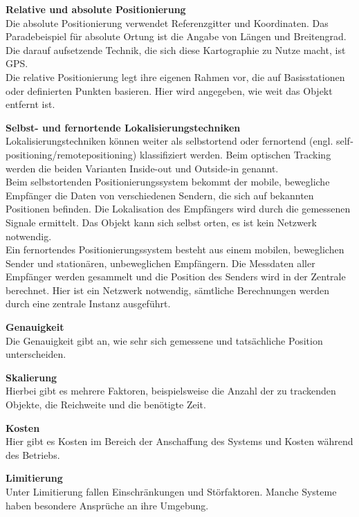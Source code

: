     \textbf{Relative und absolute Positionierung}\\
    Die absolute Positionierung verwendet Referenzgitter und Koordinaten. Das Paradebeispiel für absolute Ortung ist die Angabe von Längen­ und Breitengrad.   Die darauf aufsetzende Technik, die sich diese Kartographie zu Nutze macht, ist GPS. \\
    Die relative Positionierung legt ihre eigenen Rahmen vor, die auf Basisstationen oder definierten Punkten basieren. Hier wird angegeben, wie weit das Objekt entfernt ist.

    \textbf{Selbst- und fernortende Lokalisierungstechniken}\\
    Lokalisierungstechniken können weiter als selbstortend oder fernortend (engl. self­positioning/remote­positioning) klassifiziert werden. Beim optischen Tracking werden die beiden Varianten Inside-out und Outside-in genannt.\\
    Beim selbstortenden Positionierungssystem bekommt der mobile, bewegliche Empfänger die Daten von verschiedenen Sendern, die sich auf bekannten Positionen befinden. Die Lokalisation des Empfängers wird durch die gemessenen Signale ermittelt. Das Objekt kann sich selbst orten, es ist kein Netzwerk notwendig.\\
    Ein fernortendes Positionierungssystem besteht aus einem mobilen, beweglichen Sender und stationären, unbeweglichen Empfängern. Die Messdaten aller Empfänger werden gesammelt und die Position des Senders wird in der Zentrale berechnet. Hier ist ein Netzwerk notwendig, sämtliche Berechnungen werden durch eine zentrale Instanz ausgeführt.

    \textbf{Genauigkeit}\\
    Die Genauigkeit gibt an, wie sehr sich gemessene und tatsächliche Position unterscheiden.

    \textbf{Skalierung}\\
    Hierbei gibt es mehrere Faktoren, beispielsweise die Anzahl der zu trackenden Objekte, die Reichweite und die benötigte Zeit.

    \textbf{Kosten}\\
    Hier gibt es Kosten im Bereich der Anschaffung des Systems und Kosten während des Betriebs.

    \textbf{Limitierung}\\
    Unter Limitierung fallen Einschränkungen und Störfaktoren. Manche Systeme haben besondere Ansprüche an ihre Umgebung.



